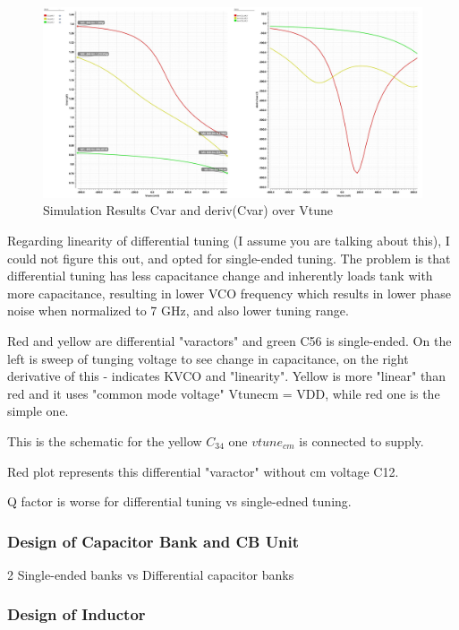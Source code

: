 \begin{figure}[ht!]
	\centering
	\includegraphics[width=\linewidth]{Figures/cvar-sweep-over-vtune-comparison.jpg}
	\caption{Simulation Results Cvar and deriv(Cvar) over Vtune}
	\label{fig:cvar-sweep-over-vtune-comparison}
\end{figure}

Regarding linearity of differential tuning (I assume you are talking about this), I could not figure this out, and opted for single-ended tuning. The problem is that differential tuning has less capacitance change and inherently loads tank with more capacitance, resulting in lower VCO frequency which results in lower phase noise when normalized to 7 GHz, and also lower tuning range.


Red and yellow are differential "varactors" and green C56 is single-ended. On the left is sweep of tunging voltage to see change in capacitance, on the right derivative of this - indicates KVCO and "linearity".
Yellow is more "linear" than red and  it uses "common mode voltage" Vtunecm = VDD, while red one is the simple one.

This is the schematic for the yellow $C_{34}$ one $vtune_{cm}$ is connected to supply.

Red plot represents this differential "varactor" without cm voltage C12.

Q factor is worse for differential tuning vs single-edned tuning.

\subsubsection{Design of Capacitor Bank and CB Unit} %

2 Single-ended banks vs Differential capacitor banks

\subsubsection{Design of Inductor}

